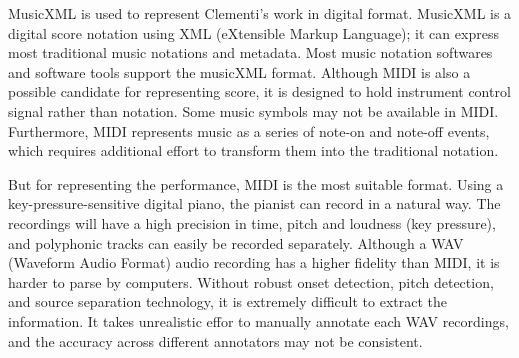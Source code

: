 MusicXML is used to represent Clementi's work in digital format.
MusicXML is a digital score notation using XML (eXtensible Markup Language); it can express most traditional music notations and metadata. Most music notation softwares and software tools support the musicXML format. %
%
Although MIDI is also a possible candidate for representing score, it is designed to hold instrument control signal rather than notation. Some music symbols may not be available in MIDI. Furthermore, MIDI represents music as a series of note-on and note-off events, which requires additional effort to transform them into the traditional notation.

But for representing the performance, MIDI is the most suitable format. Using a key-pressure-sensitive digital piano, the pianist can record in a natural way. The recordings will have a high precision in time, pitch and loudness (key pressure), and polyphonic tracks can easily be recorded separately. Although a WAV (Waveform Audio Format) audio recording has a higher fidelity than MIDI, it is harder to parse by computers. Without robust onset detection, pitch detection, and source separation technology, it is extremely difficult to extract the information. It takes unrealistic effor to manually annotate each WAV recordings, and the accuracy across different annotators may not be consistent. 


